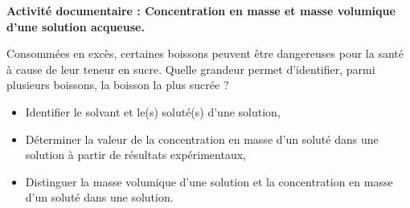 \modeCorrection

\renewcommand{\thesubsection}{\textcolor{red}{\Roman{section}.\arabic{subsection}}}
\renewcommand{\thesubsubsection}{\textcolor{red}{\Roman{section}.\arabic{subsection}.\alph{subsubsection}}}

\setcounter{section}{0}
\setcounter{document}{0}
\sndEnTeteActDeux

\begin{center}
\begin{mdframed}[style=titr, leftmargin=60pt, rightmargin=60pt, innertopmargin=7pt, innerbottommargin=7pt, innerrightmargin=8pt, innerleftmargin=8pt]

\begin{center}
\large{\textbf{Activité documentaire : Concentration en masse et masse volumique d'une solution acqueuse.}}
\end{center}

\end{mdframed}
\end{center}

\begin{tcolorbox}[colback=orange!5!white,colframe=orange!75!black,title= Contexte de l'activité]
Consommées en excès, certaines boissons peuvent être dangereuses pour la santé à cause de leur teneur en sucre. Quelle grandeur permet d’identifier, parmi plusieurs boissons, la boisson la plus sucrée ?
\end{tcolorbox}
\begin{tcolorbox}[colback=blue!5!white,colframe=blue!75!black,title=Objectifs :]
\begin{itemize}
    \item Identifier le solvant et le(s) soluté(s) d’une solution,
    \item Déterminer la valeur de la concentration en masse d’un soluté dans une solution à partir de résultats expérimentaux,
    \item Distinguer la masse volumique d’une solution et la concentration en masse d’un soluté dans une solution.
\end{itemize}
\end{tcolorbox}

   
